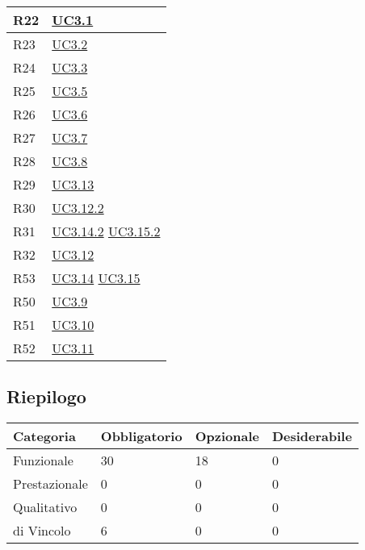\begin{longtable}{|P{6cm}|P{6cm}|}
	\hline R22 & \hyperref[UC3.1]{UC3.1} \\
	\hline R23 & \hyperref[UC3.2]{UC3.2} \\
	\hline R24 & \hyperref[UC3.3]{UC3.3} \\
	\hline R25 & \hyperref[UC3.5]{UC3.5} \\
	\hline R26 & \hyperref[UC3.6]{UC3.6} \\
	\hline R27 & \hyperref[UC3.7]{UC3.7} \\
	\hline R28 & \hyperref[UC3.8]{UC3.8} \\
	\hline R29 & \hyperref[UC3.13]{UC3.13} \\
	\hline R30 & \hyperref[UC3.12.2]{UC3.12.2} \\
	\hline R31 & \hyperref[UC3.14.2]{UC3.14.2} \linebreak \hyperref[UC3.15.2]{UC3.15.2} \\
	\hline R32 & \hyperref[UC3.12]{UC3.12} \\
	\hline R53 & \hyperref[UC3.14]{UC3.14} \linebreak \hyperref[UC3.15]{UC3.15} \\
	\hline R50 & \hyperref[UC3.9]{UC3.9} \\
	\hline R51 & \hyperref[UC3.10]{UC3.10} \\
	\hline R52 & \hyperref[UC3.11]{UC3.11} \\	
	\hline
\end{longtable}

\subsection{Riepilogo}

\begin{longtable}{|P{3cm}|P{3cm}|P{3cm}|P{3cm}|}
	\hline \textbf{Categoria} & \textbf{Obbligatorio} & \textbf{Opzionale} & \textbf{Desiderabile} \\
	\hline Funzionale & 30 & 18 & 0 \\
	\hline Prestazionale & 0 & 0 & 0 \\
	\hline Qualitativo & 0 & 0 & 0 \\
	\hline di Vincolo & 6 & 0 & 0 \\
	\hline
\end{longtable}
